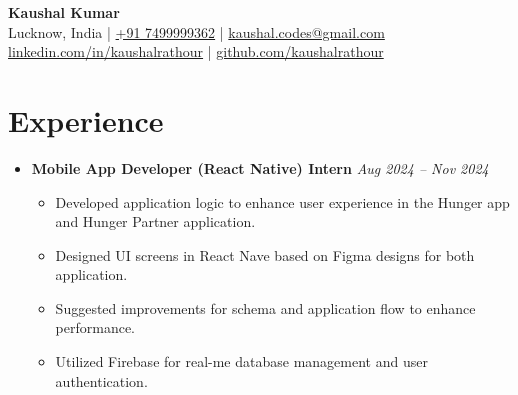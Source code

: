 \documentclass[a4paper,11pt]{article}
\newcommand{\headerfontiii}{\fontfamily{ppl}\selectfont} %
\begin{document}
\headerfontiii

\begin{center}
    {\Huge \textbf{Kaushal Kumar}} \\
    \vspace{2mm}
    \small
    Lucknow, India | \href{tel:+917499999362}{+91 7499999362} | \href{mailto:kaushal.codes@gmail.com}{kaushal.codes@gmail.com} \\
    \href{https://linkedin.com/in/kaushalrathour}{linkedin.com/in/kaushalrathour} | \href{https://github.com/kaushalrathour}{github.com/kaushalrathour}
\end{center}
\vspace{-4mm}


\section*{Experience}
\begin{itemize}[leftmargin=*]
    \item \textbf{Mobile App Developer (React Native) Intern} \hfill \textit{Aug 2024 – Nov 2024} \\
    \begin{itemize}[leftmargin=5mm]
        \item Developed application logic to enhance user experience in the Hunger app and Hunger Partner application.
        \item Designed UI screens in React Nave based on Figma designs for both application.
        \item  Suggested improvements for schema and application flow to enhance performance.
         \item Utilized Firebase for real-me database management and user authentication.
    \end{itemize}
\end{itemize}


\end{document}
